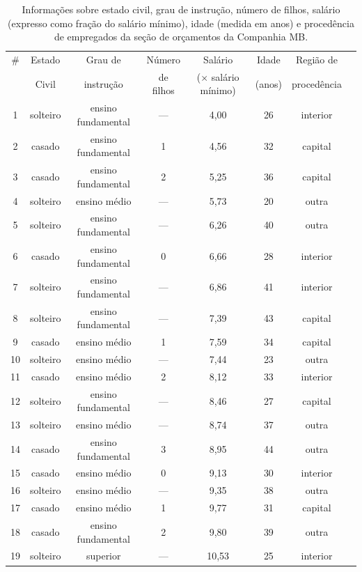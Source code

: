 \documentclass{article}
\begin{document}
\begin{enumerate}
	
	\begin{table}[thp]
	\caption{Informações sobre estado civil, grau de instrução, número de filhos, salário (expresso como fração do salário
		mínimo), idade (medida em anos) e procedência de empregados da seção de orçamentos da Companhia MB.}
	\label{tabela:companhia_MD}
	\begin{tabular}{cccccccc}
		\hline
		\# & Estado & Grau de & Número & Salário & Idade & Região de \\
		& Civil & instrução & de filhos & ($\times$ salário mínimo) & (anos) & procedência \\
		\hline
		1  & solteiro & ensino fundamental & — & 4,00  & 26 & interior \\
		2  & casado   & ensino fundamental & 1 & 4,56  & 32 & capital \\
		3  & casado   & ensino fundamental & 2 & 5,25  & 36 & capital \\
		4  & solteiro & ensino médio & — & 5,73  & 20 & outra \\
		5  & solteiro & ensino fundamental & — & 6,26  & 40 & outra \\
		6  & casado   & ensino fundamental & 0 & 6,66  & 28 & interior \\
		7  & solteiro & ensino fundamental & — & 6,86  & 41 & interior \\
		8  & solteiro & ensino fundamental & — & 7,39  & 43 & capital \\
		9  & casado   & ensino médio & 1 & 7,59  & 34 & capital \\
		10 & solteiro & ensino médio & — & 7,44  & 23 & outra \\
		11 & casado   & ensino médio & 2 & 8,12  & 33 & interior \\
		12 & solteiro & ensino fundamental & — & 8,46  & 27 & capital \\
		13 & solteiro & ensino médio & — & 8,74  & 37 & outra \\
		14 & casado   & ensino fundamental & 3 & 8,95  & 44 & outra \\
		15 & casado   & ensino médio & 0 & 9,13  & 30 & interior \\
		16 & solteiro & ensino médio & — & 9,35  & 38 & outra \\
		17 & casado   & ensino médio & 1 & 9,77  & 31 & capital \\
		18 & casado   & ensino fundamental & 2 & 9,80  & 39 & outra \\
		19 & solteiro & superior & — & 10,53 & 25 & interior \\

\end{tabular}
\end{table}
\end{enumerate}
\end{document}
